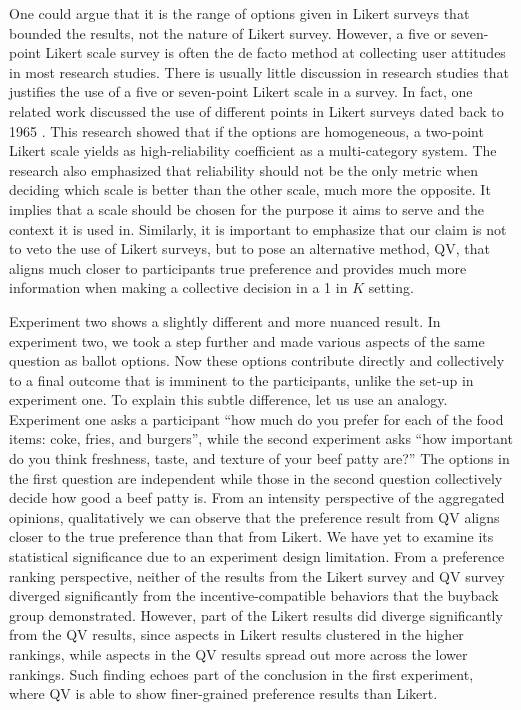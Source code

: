 One could argue that it is the range of options given in Likert surveys that bounded the results, not the nature of Likert survey. However, a five or seven-point Likert scale survey is often the de facto method at collecting user attitudes in most research studies.
There is usually little discussion in research studies that justifies the use of a five or seven-point Likert scale in a survey.
In fact, one related work discussed the use of different points in Likert surveys dated back to 1965 \cite{komorita1965number}. 
This research showed that if the options are homogeneous, a two-point Likert scale yields as high-reliability coefficient as a multi-category system.
The research also emphasized that reliability should not be the only metric when deciding which scale is better than the other scale, much more the opposite.
It implies that a scale should be chosen for the purpose it aims to serve and the context it is used in.
Similarly, it is important to emphasize that our claim is not to veto the use of Likert surveys, but to pose an alternative method, QV, that aligns much closer to participants true preference and provides much more information when making a collective decision in a 1 in $K$ setting.\par

Experiment two shows a slightly different and more nuanced result.
In experiment two,
we took a step further 
and made various aspects
of the same question as ballot options.
Now these options contribute
directly and collectively
to a final outcome
that is imminent to the participants, unlike the set-up in experiment one.
To explain this subtle difference,
let us use an analogy.
Experiment one asks a participant
``how much do you prefer for each of the food items: coke, fries, and burgers'', while
the second experiment asks
``how important do you think
freshness, taste, and texture 
of your beef patty are?''
The options in the first question are independent while those in the second question collectively decide how good a beef patty is.
From an intensity perspective of the aggregated opinions, qualitatively we can observe that the preference result from QV aligns closer to the true preference than that from Likert. We have yet to examine its statistical significance due to an experiment design limitation. From a preference ranking perspective, neither of the results from the Likert survey and QV survey diverged significantly from the incentive-compatible behaviors that the buyback group demonstrated. However, part of the Likert results did diverge significantly from the QV results, since aspects in Likert results clustered in the higher rankings, while aspects in the QV results spread out more across the lower rankings. Such finding echoes part of the conclusion in the first experiment, where QV is able to show finer-grained preference results than Likert.


